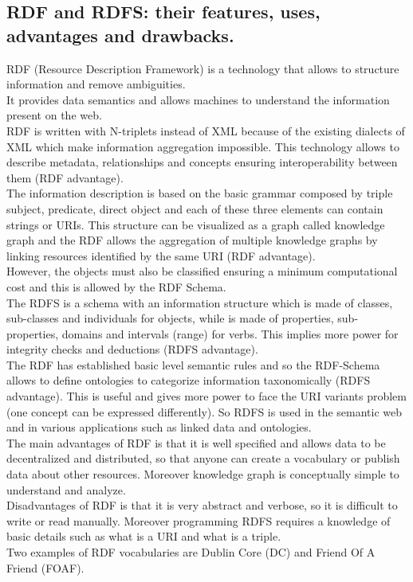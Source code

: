\subsection{RDF and RDFS: their features, uses, advantages and drawbacks.}
RDF (Resource Description Framework) is a technology that allows
to structure information and remove ambiguities.\\
It provides data semantics and allows machines to understand the
information present on the web.\\
RDF is written with N-triplets instead of XML because of the existing
dialects of XML which make information aggregation impossible.
This technology allows to describe metadata, relationships and concepts
ensuring interoperability between them (RDF advantage).\\
The information description is
based on the basic grammar composed by triple subject, predicate,
direct object and each of these three elements can contain strings or URIs.
This structure can be visualized as a graph called knowledge graph
and the RDF allows the aggregation of multiple knowledge graphs
by linking resources identified by the same URI (RDF advantage).\\
However, the objects must also be classified ensuring a minimum
computational cost and this is allowed by the RDF Schema.\\
The RDFS is a schema with an information structure which is made
of classes, sub-classes and individuals for objects,
while is made of
properties, sub-properties, domains and intervals (range) for verbs.
This implies more power for integrity checks and deductions (RDFS advantage).\\
The RDF has established basic level semantic rules and so
the RDF-Schema allows to define ontologies to categorize information
taxonomically (RDFS advantage). This is useful and gives more power
to face the URI variants problem (one concept can be expressed differently).
So RDFS is used in the semantic web and in various applications such as
linked data and ontologies.\\
The main advantages of RDF is that it is well specified
and allows data to be decentralized and distributed, so that anyone
can create a vocabulary or publish data about other
resources. Moreover knowledge graph is conceptually simple to understand
and analyze.
\\Disadvantages of RDF is that it is very abstract and verbose,
so it is difficult to write or read manually. Moreover programming
RDFS requires a knowledge of basic details such as what is a URI
and what is a triple.\\
Two examples of RDF vocabularies
are Dublin Core (DC) and Friend Of A Friend (FOAF).

